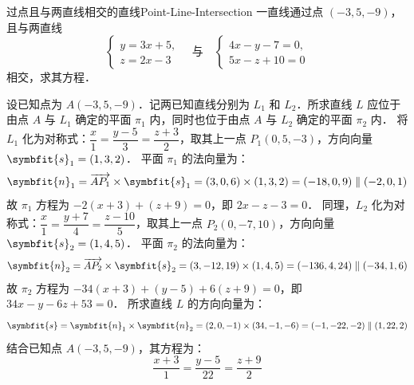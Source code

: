 \begin{problem}{过点且与两直线相交的直线}{Point-Line-Intersection}
    一直线通过点 $(-3, 5, -9)$，且与两直线
    \begin{equation}
        \begin{cases} y = 3x + 5, \\ z = 2x - 3 \end{cases} \quad \text{与} \quad \begin{cases} 4x - y - 7 = 0, \\ 5x - z + 10 = 0 \end{cases}
    \end{equation}
    相交，求其方程．
\end{problem}

\begin{solution}
    设已知点为 $A(-3, 5, -9)$．记两已知直线分别为 $L_1$ 和 $L_2$．所求直线 $L$ 应位于由点 $A$ 与 $L_1$ 确定的平面 $\pi_1$ 内，同时也位于由点 $A$ 与 $L_2$ 确定的平面 $\pi_2$ 内．
    将 $L_1$ 化为对称式：$\dfrac{x}{1} = \dfrac{y - 5}{3} = \dfrac{z + 3}{2}$，取其上一点 $P_1(0, 5, -3)$，方向向量 $\symbfit{s}_1 = (1, 3, 2)$．
    平面 $\pi_1$ 的法向量为：
    \begin{equation}
        \symbfit{n}_1 = \overrightarrow{AP_1} \times \symbfit{s}_1 = (3, 0, 6) \times (1, 3, 2) = (-18, 0, 9) \parallel (-2, 0, 1)
    \end{equation}
    故 $\pi_1$ 方程为 $-2(x + 3) + (z + 9) = 0$，即 $2x - z - 3 = 0$．
    同理，$L_2$ 化为对称式：$\dfrac{x}{1} = \dfrac{y + 7}{4} = \dfrac{z - 10}{5}$，取其上一点 $P_2(0, -7, 10)$，方向向量 $\symbfit{s}_2 = (1, 4, 5)$．
    平面 $\pi_2$ 的法向量为：
    \begin{equation}
        \symbfit{n}_2 = \overrightarrow{AP_2} \times \symbfit{s}_2 = (3, -12, 19) \times (1, 4, 5) = (-136, 4, 24) \parallel (-34, 1, 6)
    \end{equation}
    故 $\pi_2$ 方程为 $-34(x + 3) + (y - 5) + 6(z + 9) = 0$，即 $34x - y - 6z + 53 = 0$．
    所求直线 $L$ 的方向向量为：
    \begin{equation}
        \symbfit{s} = \symbfit{n}_1 \times \symbfit{n}_2 = (2, 0, -1) \times (34, -1, -6) = (-1, -22, -2) \parallel (1, 22, 2)
    \end{equation}
    结合已知点 $A(-3, 5, -9)$，其方程为：
    \begin{equation}
        \boxed{\frac{x + 3}{1} = \frac{y - 5}{22} = \frac{z + 9}{2}}
    \end{equation}
\end{solution}


